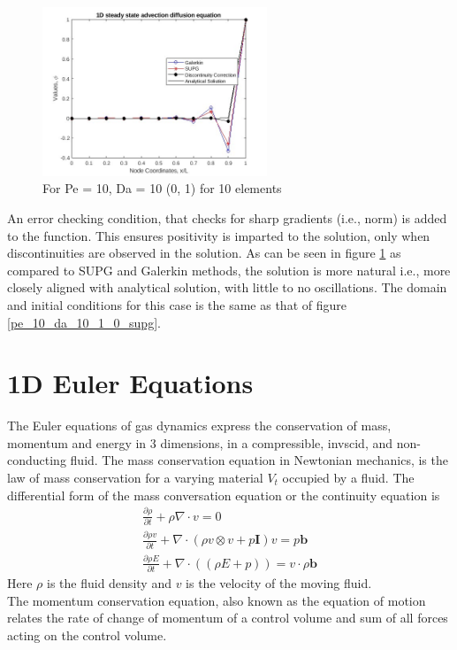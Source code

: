 \documentclass[12pt, oneside]{article}
\begin{document}
\begin{figure}[!h]
\centering
 \includegraphics[width=0.6\textwidth]{pe_10_da_10_ppv_0_1.jpg}
 \caption{For Pe = 10, Da = 10 (0, 1) for 10 elements}
 \label{pe_10_da_10_ppv_0_1}
\end{figure}
An error checking condition, that checks for sharp gradients (i.e., norm) is added to the function. This ensures positivity is imparted to the solution, only when discontinuities are observed in the solution. As can be seen in figure \ref{pe_10_da_10_ppv_0_1} as compared to SUPG and Galerkin methods, the solution is more natural i.e., more closely aligned with analytical solution, with little to no oscillations. The domain and initial conditions for this case is the same as that of figure \ref{pe_10_da_10_1_0_supg}.
\section{1D Euler Equations}
The Euler equations of gas dynamics express the conservation of mass, momentum and energy in 3 dimensions, in a compressible, invscid, and non-conducting fluid. The mass conservation equation in Newtonian mechanics, is the law of mass conservation for a varying material $V_t$ occupied by a fluid. The differential form of the mass conversation equation or the continuity equation is
\begin{subequations}
   \begin{align}
       \frac{\partial \rho}{\partial t} + \rho  \nabla \cdot v = 0 \label{mass_eqn}\\
       \frac{\partial \rho v}{\partial t} + \nabla \cdot \left( \rho v \otimes v + p \textbf{I}\right)v = p \textbf{b}\\
       \frac{\partial \rho E}{\partial t} + \nabla \cdot \left( \left( \rho E + p \right)  \right) = v \cdot \rho \textbf{b}
   \end{align}
\end{subequations}
Here $\rho$ is the fluid density and $v$ is the velocity of the moving fluid.\\
The momentum conservation equation, also known as the equation of motion relates the rate of change of momentum of a control volume and sum of all forces acting on the control volume. 
\end{document}
